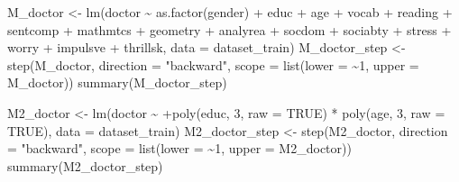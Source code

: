 \documentclass[
]{article}
\newenvironment{Shaded}{\begin{snugshade}}{\end{snugshade}}
\newcommand{\AttributeTok}[1]{\textcolor[rgb]{0.77,0.63,0.00}{#1}}
\newcommand{\ConstantTok}[1]{\textcolor[rgb]{0.00,0.00,0.00}{#1}}
\newcommand{\DecValTok}[1]{\textcolor[rgb]{0.00,0.00,0.81}{#1}}
\newcommand{\FunctionTok}[1]{\textcolor[rgb]{0.00,0.00,0.00}{#1}}
\newcommand{\NormalTok}[1]{#1}
\newcommand{\OtherTok}[1]{\textcolor[rgb]{0.56,0.35,0.01}{#1}}
\newcommand{\SpecialCharTok}[1]{\textcolor[rgb]{0.00,0.00,0.00}{#1}}
\newcommand{\StringTok}[1]{\textcolor[rgb]{0.31,0.60,0.02}{#1}}
\begin{document}
\begin{Shaded}
\begin{Highlighting}[]
\NormalTok{M\_doctor }\OtherTok{\textless{}{-}} \FunctionTok{lm}\NormalTok{(doctor }\SpecialCharTok{\textasciitilde{}} \FunctionTok{as.factor}\NormalTok{(gender) }\SpecialCharTok{+}\NormalTok{ educ }\SpecialCharTok{+}\NormalTok{ age }\SpecialCharTok{+}\NormalTok{ vocab }\SpecialCharTok{+}
\NormalTok{    reading }\SpecialCharTok{+}\NormalTok{ sentcomp }\SpecialCharTok{+}\NormalTok{ mathmtcs }\SpecialCharTok{+}\NormalTok{ geometry }\SpecialCharTok{+}\NormalTok{ analyrea }\SpecialCharTok{+}\NormalTok{ socdom }\SpecialCharTok{+}
\NormalTok{    sociabty }\SpecialCharTok{+}\NormalTok{ stress }\SpecialCharTok{+}\NormalTok{ worry }\SpecialCharTok{+}\NormalTok{ impulsve }\SpecialCharTok{+}\NormalTok{ thrillsk, }\AttributeTok{data =}\NormalTok{ dataset\_train)}
\NormalTok{M\_doctor\_step }\OtherTok{\textless{}{-}} \FunctionTok{step}\NormalTok{(M\_doctor, }\AttributeTok{direction =} \StringTok{"backward"}\NormalTok{, }\AttributeTok{scope =} \FunctionTok{list}\NormalTok{(}\AttributeTok{lower =} \SpecialCharTok{\textasciitilde{}}\DecValTok{1}\NormalTok{,}
    \AttributeTok{upper =}\NormalTok{ M\_doctor))}
\FunctionTok{summary}\NormalTok{(M\_doctor\_step)}
\end{Highlighting}
\end{Shaded}

\begin{Shaded}
\begin{Highlighting}[]
\NormalTok{M2\_doctor }\OtherTok{\textless{}{-}} \FunctionTok{lm}\NormalTok{(doctor }\SpecialCharTok{\textasciitilde{}} \SpecialCharTok{+}\FunctionTok{poly}\NormalTok{(educ, }\DecValTok{3}\NormalTok{, }\AttributeTok{raw =} \ConstantTok{TRUE}\NormalTok{) }\SpecialCharTok{*} \FunctionTok{poly}\NormalTok{(age,}
    \DecValTok{3}\NormalTok{, }\AttributeTok{raw =} \ConstantTok{TRUE}\NormalTok{), }\AttributeTok{data =}\NormalTok{ dataset\_train)}
\NormalTok{M2\_doctor\_step }\OtherTok{\textless{}{-}} \FunctionTok{step}\NormalTok{(M2\_doctor, }\AttributeTok{direction =} \StringTok{"backward"}\NormalTok{, }\AttributeTok{scope =} \FunctionTok{list}\NormalTok{(}\AttributeTok{lower =} \SpecialCharTok{\textasciitilde{}}\DecValTok{1}\NormalTok{,}
    \AttributeTok{upper =}\NormalTok{ M2\_doctor))}
\FunctionTok{summary}\NormalTok{(M2\_doctor\_step)}
\end{Highlighting}
\end{Shaded}
\end{document}
